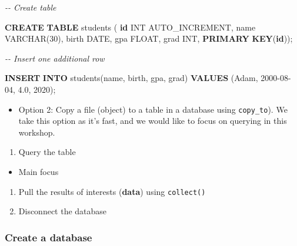 \documentclass[
]{book}
\newenvironment{Shaded}{\begin{snugshade}}{\end{snugshade}}
\newcommand{\CommentTok}[1]{\textcolor[rgb]{0.56,0.35,0.01}{\textit{#1}}}
\newcommand{\DataTypeTok}[1]{\textcolor[rgb]{0.13,0.29,0.53}{#1}}
\newcommand{\DecValTok}[1]{\textcolor[rgb]{0.00,0.00,0.81}{#1}}
\newcommand{\FloatTok}[1]{\textcolor[rgb]{0.00,0.00,0.81}{#1}}
\newcommand{\KeywordTok}[1]{\textcolor[rgb]{0.13,0.29,0.53}{\textbf{#1}}}
\newcommand{\NormalTok}[1]{#1}
\newcommand{\StringTok}[1]{\textcolor[rgb]{0.31,0.60,0.02}{#1}}
\providecommand{\tightlist}{%
  \setlength{\itemsep}{0pt}\setlength{\parskip}{0pt}}
\begin{document}
\begin{Shaded}
\begin{Highlighting}[]

\CommentTok{{-}{-} Create table }

\KeywordTok{CREATE} \KeywordTok{TABLE}\NormalTok{ students (}
    \KeywordTok{id} \DataTypeTok{INT}\NormalTok{ AUTO\_INCREMENT,}
\NormalTok{    name }\DataTypeTok{VARCHAR}\NormalTok{(}\DecValTok{30}\NormalTok{),}
\NormalTok{    birth }\DataTypeTok{DATE}\NormalTok{,}
\NormalTok{    gpa }\DataTypeTok{FLOAT}\NormalTok{,}
\NormalTok{    grad }\DataTypeTok{INT}\NormalTok{,}
    \KeywordTok{PRIMARY} \KeywordTok{KEY}\NormalTok{(}\KeywordTok{id}\NormalTok{));}

\CommentTok{{-}{-} Insert one additional row }

\KeywordTok{INSERT} \KeywordTok{INTO}\NormalTok{ students(name, birth, gpa, grad)}
      \KeywordTok{VALUES}\NormalTok{ (}\StringTok{\textquotesingle{}Adam\textquotesingle{}}\NormalTok{, }\StringTok{\textquotesingle{}2000{-}08{-}04\textquotesingle{}}\NormalTok{, }\FloatTok{4.0}\NormalTok{, }\DecValTok{2020}\NormalTok{);}
\end{Highlighting}
\end{Shaded}

\begin{itemize}
\tightlist
\item
  Option 2: Copy a file (object) to a table in a database using \texttt{copy\_to}). We take this option as it's fast, and we would like to focus on querying in this workshop.
\end{itemize}

\begin{enumerate}
\def\labelenumi{\arabic{enumi}.}
\setcounter{enumi}{2}
\tightlist
\item
  Query the table
\end{enumerate}

\begin{itemize}
\tightlist
\item
  Main focus
\end{itemize}

\begin{enumerate}
\def\labelenumi{\arabic{enumi}.}
\setcounter{enumi}{3}
\item
  Pull the results of interests (\textbf{data}) using \texttt{collect()}
\item
  Disconnect the database
\end{enumerate}

\subsubsection{Create a database}\label{create-a-database}
\end{document}
